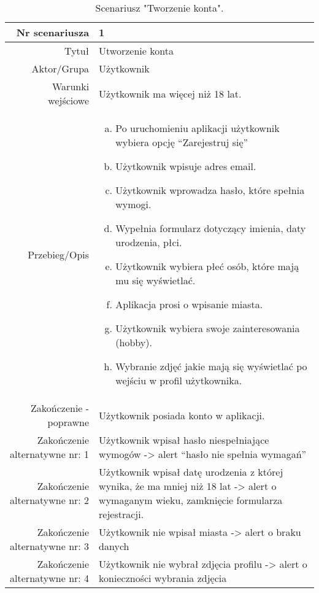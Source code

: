 \documentclass[12pt,a4paper]{article}
\begin{document}
\begin{table} [H]
\centering
\begin{tabular}{|r|p{9cm}|} \hline
Nr scenariusza & 1 \\
\hline
Tytuł & Utworzenie konta\\
\hline
Aktor/Grupa & Użytkownik \\
\hline
Warunki wejściowe & Użytkownik ma więcej niż 18 lat. \\
\hline
Przebieg/Opis & 
\begin{enumerate}[a)]
\item Po uruchomieniu aplikacji użytkownik wybiera opcję “Zarejestruj się”
\item Użytkownik wpisuje adres email.
\item Użytkownik wprowadza hasło, które spełnia wymogi.
\item Wypełnia formularz dotyczący imienia, daty urodzenia, płci.
\item Użytkownik wybiera płeć osób, które mają mu się wyświetlać.
\item Aplikacja prosi o wpisanie miasta.
\item Użytkownik wybiera swoje zainteresowania (hobby).
\item Wybranie zdjęć jakie mają się wyświetlać po wejściu w profil użytkownika.


\end{enumerate}
\\
\hline
Zakończenie - poprawne & Użytkownik posiada konto w aplikacji.
\\ 
\hline
Zakończenie alternatywne nr: 1 & Użytkownik wpisał hasło niespełniające wymogów -> alert “hasło nie spełnia wymagań”
\\
\hline
Zakończenie alternatywne nr: 2 & Użytkownik wpisał datę urodzenia z której wynika, że ma mniej niż 18 lat -> alert o wymaganym wieku, zamknięcie formularza rejestracji.
\\
\hline
Zakończenie alternatywne nr: 3 & Użytkownik nie wpisał miasta -> alert o braku danych
\\
\hline
Zakończenie alternatywne nr: 4 & Użytkownik nie wybrał zdjęcia profilu -> alert o konieczności wybrania zdjęcia
\\
\hline
\end{tabular}
\caption{Scenariusz "Tworzenie konta".}
\label{table:1}
\end{table}
\end{document}
